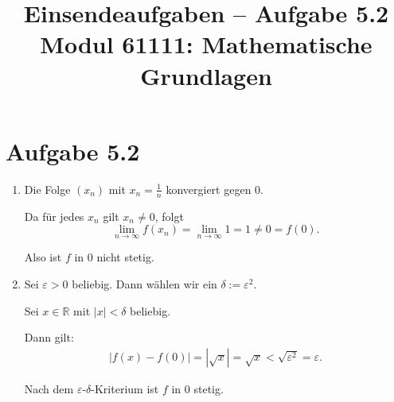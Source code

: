 \documentclass[a4paper,12pt]{article}
\title{Einsendeaufgaben -- Aufgabe 5.2\\[0.5em]
\large Modul 61111: Mathematische Grundlagen}
\author{}
\date{}
\begin{document}
\maketitle

\section*{Aufgabe 5.2}

\begin{enumerate}[label=\alph*)]

    \item
    Die Folge $(x_n)$ mit $x_n = \frac{1}{n}$ konvergiert gegen $0$.

    Da für jedes $x_n$ gilt $x_n \neq 0$, folgt
    \[
        \lim_{n \to \infty} f(x_n) = \lim_{n \to \infty} 1 = 1 \neq 0 = f(0).
    \]

    Also ist $f$ in $0$ nicht stetig.

    \item
    Sei $\varepsilon > 0$ beliebig. Dann wählen wir
    ein $\delta := \varepsilon^2$.

    Sei $x \in \mathbb{R}$ mit $|x| < \delta$ beliebig.

    Dann gilt:
    \begin{align*}
        |f(x) - f(0)| = |\sqrt{x}| = \sqrt{x}
        < \sqrt{\varepsilon^2} = \varepsilon.
    \end{align*}

    Nach dem $\varepsilon$-$\delta$-Kriterium ist $f$ in $0$ stetig.

\end{enumerate}
\end{document}

